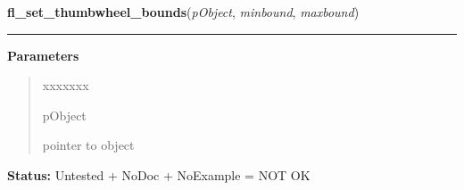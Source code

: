 \hspace{.8\funcindent}\begin{boxedminipage}{\funcwidth}

    \raggedright \textbf{fl\_set\_thumbwheel\_bounds}(\textit{pObject}, \textit{minbound}, \textit{maxbound})

    \vspace{-1.5ex}

    \rule{\textwidth}{0.5\fboxrule}
\setlength{\parskip}{2ex}
\setlength{\parskip}{1ex}
      \textbf{Parameters}
      \vspace{-1ex}

      \begin{quote}
        \begin{Ventry}{xxxxxxx}

          \item[pObject]

          pointer to object

        \end{Ventry}

      \end{quote}

\textbf{Status:} Untested + NoDoc + NoExample = NOT OK



    \end{boxedminipage}

    \label{xformslib:library:fl_get_thumbwheel_bounds}

    \vspace{0.5ex}

